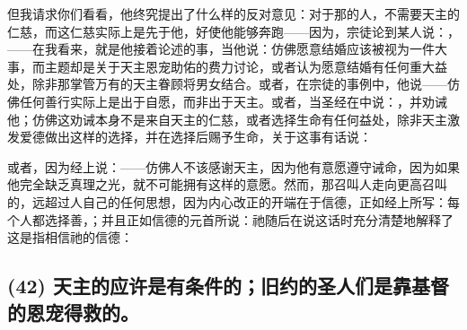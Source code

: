 但我请求你们看看，他终究提出了什么样的反对意见：对于那的人，不需要天主的仁慈，而这仁慈实际上是先于他，好使他能够奔跑——因为，宗徒论到某人说：，——在我看来，就是他接着论述的事，当他说：仿佛愿意结婚应该被视为一件大事，而主题却是关于天主恩宠助佑的费力讨论，或者认为愿意结婚有任何重大益处，除非那掌管万有的天主眷顾将男女结合。或者，在宗徒的事例中，他说——仿佛任何善行实际上是出于自愿，而非出于天主。或者，当圣经在中说：，并劝诫他；仿佛这劝诫本身不是来自天主的仁慈，或者选择生命有任何益处，除非天主激发爱德做出这样的选择，并在选择后赐予生命，关于这事有话说：\par

或者，因为经上说：——仿佛人不该感谢天主，因为他有意愿遵守诫命，因为如果他完全缺乏真理之光，就不可能拥有这样的意愿。然而，那召叫人走向更高召叫的，远超过人自己的任何思想，因为内心改正的开端在于信德，正如经上所写：每个人都选择善，；并且正如信德的元首所说：祂随后在说这话时充分清楚地解释了这是指相信祂的信德：\par


\subsection{(42) 天主的应许是有条件的；旧约的圣人们是靠基督的恩宠得救的。}

